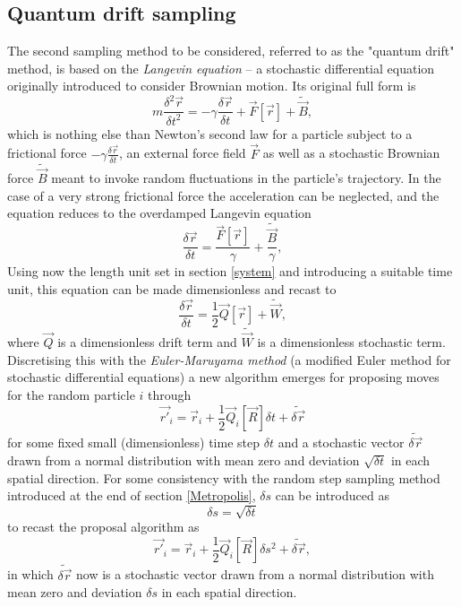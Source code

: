 \documentclass[a4paper,8pt]{article}
\begin{document}
\begin{multicols}{2}
\subsection{Quantum drift sampling}\label{QDsampling}
The second sampling method to be considered, referred to as the "quantum drift" method, is based on the \textit{Langevin equation} – a stochastic differential equation originally introduced to consider Brownian motion. Its original full form is
\begin{equation}
m\frac{\delta^2\vec{r}}{\delta t^2} = -\gamma\frac{\delta\vec{r}}{\delta t}+\vec{F}[\vec{r}]+\widetilde{\vec{B}},
\end{equation}
which is nothing else than Newton's second law for a particle subject to a frictional force $-\gamma\frac{\delta\vec{r}}{\delta t}$, an external force field $\vec{F}$ as well as a stochastic Brownian force $\widetilde{\vec{B}}$ meant to invoke random fluctuations in the particle's trajectory. In the case of a very strong frictional force the acceleration can be neglected, and the equation reduces to the overdamped Langevin equation
\begin{equation}
\frac{\delta\vec{r}}{\delta t} = \frac{\vec{F}[\vec{r}]}{\gamma}+\frac{\widetilde{\vec{B}}}{\gamma},
\end{equation}
Using now the length unit set in section \ref{system} and introducing a suitable time unit, this equation can be made dimensionless and recast to
\begin{equation}\label{Langevin}
\frac{\delta\vec{r}}{\delta t} = \frac{1}{2}\vec{Q}[\vec{r}]+\widetilde{\vec{W}}, 
\end{equation}
where $\vec{Q}$ is a dimensionless drift term and $\widetilde{\vec{W}}$ is a dimensionless stochastic term. Discretising this with the \textit{Euler-Maruyama method} (a modified Euler method for stochastic differential equations) a new algorithm emerges for proposing moves for the random particle $i$ through
\begin{equation}
\vec{r'}_i = \vec{r}_i+\frac{1}{2}\vec{Q}_i[\vec{R}]\delta t + \widetilde{\delta\vec{r}}
\end{equation}
for some fixed small (dimensionless) time step $\delta t$ and a stochastic vector $\widetilde{\delta\vec{r}}$ drawn from a normal distribution with mean zero and deviation $\sqrt{\delta t}$ in each spatial direction. For some consistency with the random step sampling method introduced at the end of section \ref{Metropolis}, $\delta s$ can be introduced as
\begin{equation}
\delta s = \sqrt{\delta t}
\end{equation}
to recast the proposal algorithm as
\begin{equation}\label{propLD}
\vec{r'}_i = \vec{r}_i+\frac{1}{2}\vec{Q}_i[\vec{R}]\delta s^2 + \widetilde{\delta\vec{r}}, 
\end{equation}
in which $\widetilde{\delta\vec{r}}$ now is a stochastic vector drawn from a normal distribution with mean zero and deviation $\delta s$ in each spatial direction.


\end{multicols}
\end{document}
